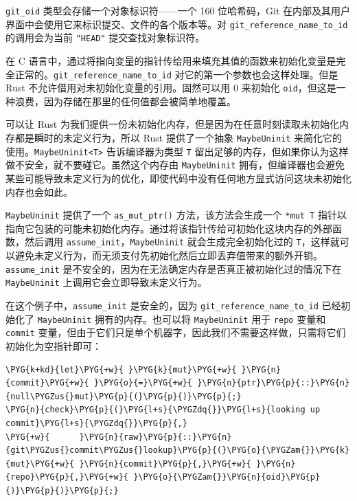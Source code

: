\texttt{git\_oid} 类型会存储一个对象标识符——一个 160 位哈希码，Git 在内部及其用户界面中会使用它来标识提交、文件的各个版本等。对 \texttt{git\_reference\_name\_to\_id} 的调用会为当前 \texttt{"HEAD"} 提交查找对象标识符。

在 C 语言中，通过将指向变量的指针传给用来填充其值的函数来初始化变量是完全正常的。\texttt{git\_reference\_name\_to\_id} 对它的第一个参数也会这样处理。但是 Rust 不允许借用对未初始化变量的引用。固然可以用 0 来初始化 \texttt{oid}，但这是一种浪费，因为存储在那里的任何值都会被简单地覆盖。

可以让 Rust 为我们提供一份未初始化内存，但是因为在任意时刻读取未初始化内存都是瞬时的未定义行为，所以 Rust 提供了一个抽象 \texttt{MaybeUninit} 来简化它的使用。\texttt{MaybeUninit<T>} 告诉编译器为类型 \texttt{T} 留出足够的内存，但如果你认为这样做不安全，就不要碰它。虽然这个内存由 \texttt{MaybeUninit} 拥有，但编译器也会避免某些可能导致未定义行为的优化，即使代码中没有任何地方显式访问这块未初始化内存也会如此。

\texttt{MaybeUninit} 提供了一个 \texttt{as\_mut\_ptr()} 方法，该方法会生成一个 \texttt{*mut T} 指针以指向它包装的可能未初始化内存。通过将该指针传给可初始化这块内存的外部函数，然后调用 \texttt{assume\_init}，\texttt{MaybeUninit} 就会生成完全初始化过的 \texttt{T}，这样就可以避免未定义行为，而无须支付先初始化然后立即丢弃值带来的额外开销。\texttt{assume\_init} 是不安全的，因为在无法确定内存是否真正被初始化过的情况下在 \texttt{MaybeUninit} 上调用它会立即导致未定义行为。

在这个例子中，\texttt{assume\_init} 是安全的，因为 \texttt{git\_reference\_name\_to\_id} 已经初始化了 \texttt{MaybeUninit} 拥有的内存。也可以将 \texttt{MaybeUninit} 用于 \texttt{repo} 变量和 \texttt{commit} 变量，但由于它们只是单个机器字，因此我们不需要这样做，只需将它们初始化为空指针即可：

\begin{Verbatim}[commandchars=\\\{\},breaklines=true,breakanywhere=true,fontsize=\codefont,xleftmargin=17bp]
\PYG{k+kd}{let}\PYG{+w}{ }\PYG{k}{mut}\PYG{+w}{ }\PYG{n}{commit}\PYG{+w}{ }\PYG{o}{=}\PYG{+w}{ }\PYG{n}{ptr}\PYG{p}{::}\PYG{n}{null\PYGZus{}mut}\PYG{p}{(}\PYG{p}{)}\PYG{p}{;}
\PYG{n}{check}\PYG{p}{(}\PYG{l+s}{\PYGZdq{}}\PYG{l+s}{looking up commit}\PYG{l+s}{\PYGZdq{}}\PYG{p}{,}
\PYG{+w}{      }\PYG{n}{raw}\PYG{p}{::}\PYG{n}{git\PYGZus{}commit\PYGZus{}lookup}\PYG{p}{(}\PYG{o}{\PYGZam{}}\PYG{k}{mut}\PYG{+w}{ }\PYG{n}{commit}\PYG{p}{,}\PYG{+w}{ }\PYG{n}{repo}\PYG{p}{,}\PYG{+w}{ }\PYG{o}{\PYGZam{}}\PYG{n}{oid}\PYG{p}{)}\PYG{p}{)}\PYG{p}{;}
\end{Verbatim}

